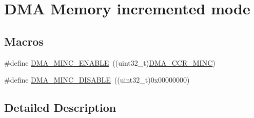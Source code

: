 \hypertarget{group___d_m_a___memory__incremented__mode}{\section{D\-M\-A Memory incremented mode}
\label{group___d_m_a___memory__incremented__mode}
}
\subsection*{Macros}
\begin{DoxyCompactItemize}
\item 
\#define \hyperlink{group___d_m_a___memory__incremented__mode_ga43d30885699cc8378562316ff4fed1cd}{D\-M\-A\-\_\-\-M\-I\-N\-C\-\_\-\-E\-N\-A\-B\-L\-E}~((uint32\-\_\-t)\hyperlink{group___peripheral___registers___bits___definition_gaa189138f534283d876f654ec9474987e}{D\-M\-A\-\_\-\-C\-C\-R\-\_\-\-M\-I\-N\-C})
\item 
\#define \hyperlink{group___d_m_a___memory__incremented__mode_ga32625330516c188151743473fad97a33}{D\-M\-A\-\_\-\-M\-I\-N\-C\-\_\-\-D\-I\-S\-A\-B\-L\-E}~((uint32\-\_\-t)0x00000000)
\end{DoxyCompactItemize}


\subsection{Detailed Description}


